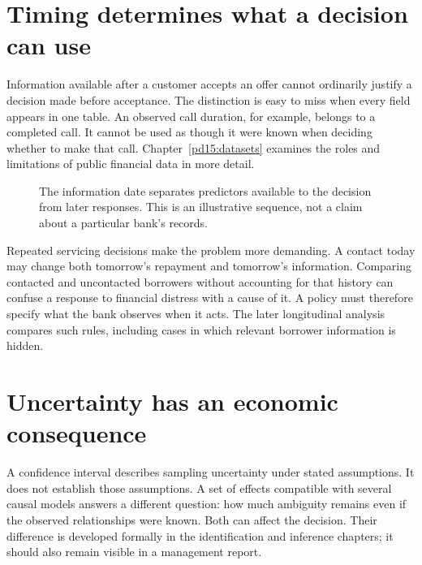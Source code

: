 \section{Timing determines what a decision can use}

Information available after a customer accepts an offer cannot ordinarily
justify a decision made before acceptance. The distinction is easy to miss
when every field appears in one table. An observed call duration, for example,
belongs to a completed call. It cannot be used as though it were known when
deciding whether to make that call. Chapter~\ref{pd15:datasets} examines the
roles and limitations of public financial data in more detail.

\begin{figure}[htbp]\centering
{}
\caption{The information date separates predictors available to the decision
from later responses. This is an illustrative sequence, not a claim about a
particular bank's records.}
\label{reading:time}
\end{figure}

Repeated servicing decisions make the problem more demanding. A contact today
may change both tomorrow's repayment and tomorrow's information. Comparing
contacted and uncontacted borrowers without accounting for that history can
confuse a response to financial distress with a cause of it. A policy must
therefore specify what the bank observes when it acts. The later longitudinal
analysis compares such rules, including cases in which relevant borrower
information is hidden.

\section{Uncertainty has an economic consequence}

A confidence interval describes sampling uncertainty under stated assumptions.
It does not establish those assumptions. A set of effects compatible with
several causal models answers a different question: how much ambiguity remains
even if the observed relationships were known. Both can affect the decision.
Their difference is developed formally in the identification and inference
chapters; it should also remain visible in a management report.

